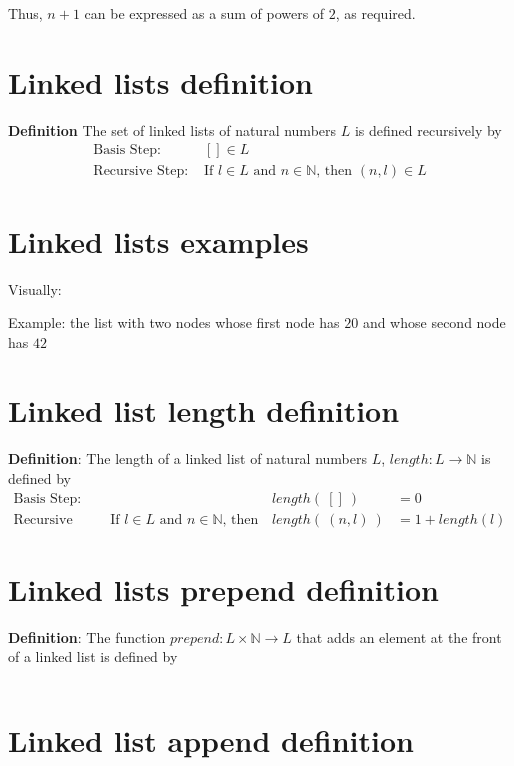 \documentclass[12pt, oneside]{article}
\begin{document}
Thus, $n+1$ can be expressed as a sum of powers of $2$, as required. \vfill
\section*{Linked lists definition}


{\bf Definition} The set of linked lists of natural numbers $L$ is defined recursively by
\[
\begin{array}{ll}
    \textrm{Basis Step: } & [] \in L \\
    \textrm{Recursive Step: } & \textrm{If } l \in L\textrm{ and }n \in \mathbb{N} \textrm{, then } (n, l) \in L
\end{array}
\] \vfill
\section*{Linked lists examples}


Visually:

\vspace{50pt}

Example: the list with two nodes whose first node has $20$ and whose second node
has $42$

\vspace{50pt} \vfill
\section*{Linked list length definition}


{\bf Definition}: The length of a linked list of natural numbers $L$, $length: L \to \mathbb{N}$ is defined by
\[
\begin{array}{llll}
\textrm{Basis Step:} &  & length(~[]~) &= 0 \\
\textrm{Recursive Step:} & \textrm{If } l \in L\textrm{ and }n \in \mathbb{N}\textrm{, then  } & length(~(n, l)~)  &= 1+ length(l)
\end{array}
\]
 \vfill
\section*{Linked lists prepend definition}


{\bf Definition}: The function $prepend : L \times \mathbb{N} \to L$ that adds an element at the 
front of a linked list is defined by
\[
\phantom{prepend(~(l, n)~) = (n, l)}
\]
 \vfill
\section*{Linked list append definition}
\end{document}
